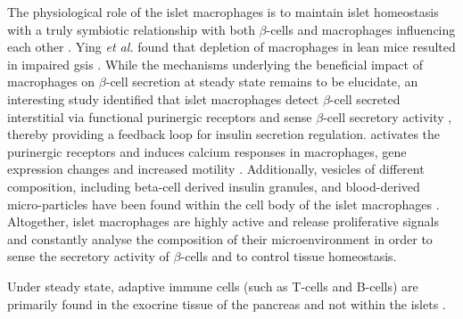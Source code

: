 \par The physiological role of the islet macrophages is to maintain islet homeostasis with a truly symbiotic relationship with both $\beta$-cells and macrophages influencing each other \textbf{\cite{unanue_macrophages_2016}}. Ying \textit{et al.} found that depletion of macrophages in lean mice resulted in impaired \gls{gsis} \textbf{\cite{ying_expansion_2019}}. While the mechanisms underlying the beneficial impact of macrophages on $\beta$-cell secretion at steady state remains to be elucidate, an interesting study identified  that islet macrophages %
detect $\beta$-cell secreted interstitial  via functional purinergic receptors and sense $\beta$-cell secretory activity \textbf{\cite{weitz_mouse_2018}}, thereby providing a feedback loop for insulin secretion regulation.  activates the purinergic receptors and induces calcium responses in macrophages, gene expression changes and increased motility \textbf{\cite{cosentino_crosstalk_2021}}. Additionally, vesicles of different composition, including beta-cell derived insulin granules, and blood-derived micro-particles have been found within the cell body of the islet macrophages \textbf{\cite{vomund_beta_2015,zinselmeyer_resident_2018}}. Altogether, islet macrophages are highly active and release proliferative signals and constantly analyse the composition of their microenvironment in order to sense the secretory activity of $\beta$-cells and to control tissue homeostasis.\\


\par Under steady state, adaptive immune cells (such as T-cells and B-cells) are primarily found in the exocrine tissue of the pancreas and not within the islets \textbf{\cite{calderon_pancreas_2015, ying_expansion_2019}}.


% 






